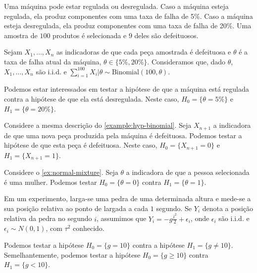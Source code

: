\begin{example}
 \label{example:hyp-binomial}
 Uma máquina pode estar regulada ou desregulada.
 Caso a máquina esteja regulada, 
 ela produz componentes com uma taxa de falha de 5\%.
 Caso a máquina esteja desregulada,
 ela produz componentes com uma taxa de falha de 20\%.
 Uma amostra de $100$ produtos é selecionada e 
 $9$ deles são defeituosos.
 
 Sejam $X_{1},\ldots,X_{n}$ as indicadoras de que
 cada peça amostrada é defeituosa e 
 $\theta$ é a taxa de falha atual da máquina, 
 $\theta \in \{5\%, 20\%\}$.
 Consideramos que, dado 
 $\theta$, $X_{1},\ldots,X_{n}$ são i.i.d. e
 $\sum_{i=1}^{100}{X_{i}}|\theta \sim \text{Binomial}(100,\theta)$.

 Podemos estar interessados em testar a hipótese de
 que a máquina está regulada contra 
 a hipótese de que ela está desregulada.
 Neste caso, $H_{0} = \{\theta = 5\%\}$ e 
 $H_{1} = \{\theta = 20\%\}$.
\end{example}

\begin{example}
 \label{example:hyp-binomial-predictive}
 Considere a mesma descrição do \cref{example:hyp-binomial}.
 Seja $X_{n+1}$ a indicadora de que 
 uma nova peça produzida pela máquina é defeituosa.
 Podemos testar a hipótese de que
 esta peça é defeituosa.
 Neste caso, $H_{0} = \{X_{n+1}=0\}$ e 
 $H_{1} = \{X_{n+1}=1\}$.
\end{example}

\begin{example}
 \label{example:hyp-logistica}
 Considere o \cref{ex:normal-mixture}.
 Seja $\theta$ a indicadora de que 
 a pessoa selecionada é uma mulher.
 Podemos testar $H_{0}=\{\theta=0\}$ contra 
 $H_{1}=\{\theta=1\}$. 
\end{example}

\begin{example}
 \label{example:hyp-linear-regression}
 Em um experimento, 
 larga-se uma pedra de uma determinada altura e 
 mede-se a sua posição relativa ao ponto de largada
 a cada $1$ segundo.
 Se $Y_{i}$ denota a posição relativa da pedra 
 no segundo $i$,
 assumimos que $Y_{i} = -g\frac{i^{2}}{2} + \epsilon_{i}$,
 onde $\epsilon_{i}$ são i.i.d. e 
 $\epsilon_{i} \sim N(0,1)$,
 com $\tau^{2}$ conhecido.

 Podemos testar a hipótese $H_{0} = \{g = 10\}$ contra 
 a hipótese $H_{1} = \{g \neq 10\}$.
 Semelhantemente, podemos testar a hipótese 
 $H_{0} = \{g \geq 10\}$ contra $H_{1} = \{g < 10\}$.
\end{example}

